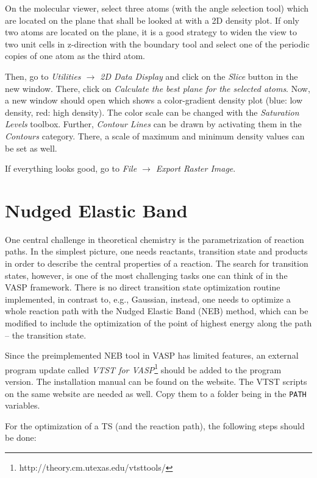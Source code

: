 \documentclass[a4paper,11pt]{article}
\begin{document}
On the molecular viewer, select three atoms (with the angle selection tool) which are
located on the plane that shall be looked at with a 2D density plot.
If only two atoms are located on the plane, it is a good strategy to widen the
view to two unit cells in z-direction with the boundary tool and select one
of the periodic copies of one atom as the third atom.

Then, go to \textit{Utilities $\rightarrow$ 2D Data Display} and click on the \textit{Slice}
button in the new window. There, click on \textit{Calculate the best plane for the
selected atoms}. Now, a new window should open which shows a color-gradient density
plot (blue: low density, red: high density).
The color scale can be changed with the \textit{Saturation Levels} toolbox.
Further, \textit{Contour Lines} can be drawn by activating them in the
\textit{Contours} category. There, a scale of maximum and minimum density
values can be set as well.

If everything looks good, go to \textit{File $\rightarrow$ Export Raster Image}.


\section{Nudged Elastic Band}

One central challenge in theoretical chemistry is the parametrization of reaction paths.
In the simplest picture, one needs reactants, transition state and products in order to
describe the central properties of a reaction.
The search for transition states, however, is one of the most challenging tasks one 
can think of in the VASP framework.
There is no direct transition state optimization routine implemented, in contrast to, e.g., 
Gaussian, instead, one needs to optimize a whole reaction path with the Nudged Elastic 
Band (NEB) method, which can be modified to include the optimization of the point
of highest energy along the path -- the transition state.

Since the preimplemented NEB tool in VASP has limited features, an external program 
update called \textit{VTST for VASP}\footnote{http://theory.cm.utexas.edu/vtsttools/} should be
added to the program version.
The installation manual can be found on the website.
The VTST scripts on the same website are needed as well. Copy them to a folder being in the 
\texttt{PATH} variables.

For the optimization of a TS (and the reaction path), the following steps should be done:
\end{document}
